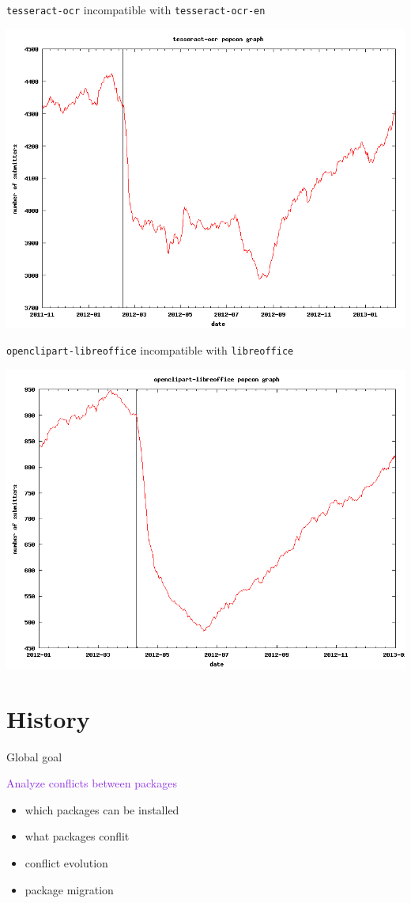 \documentclass[xcolor={dvipsnames}]{beamer}
\newcommand{\EEE}[1]{\textcolor{BlueViolet}{#1}}
\begin{document}
\begin{frame}
\texttt{tesseract-ocr} incompatible with \texttt{tesseract-ocr-en}
\begin{center}
\includegraphics[width=0.8\linewidth]{figures/tesseract-ocr}
\end{center}
\end{frame}

\begin{frame}
\texttt{openclipart-libreoffice} incompatible with \texttt{libreoffice}
\begin{center}
\includegraphics[width=0.8\linewidth]{figures/openclipart-libreoffice}
\end{center}
\end{frame}

\part{History}
\frame{\partpage}

\begin{frame}{Global goal}

\EEE{Analyze conflicts between packages}
\begin{itemize}
\item which packages can be installed
\item what packages conflit
\item conflict evolution
\item package migration
\end{itemize}

\end{frame}
\end{document}
